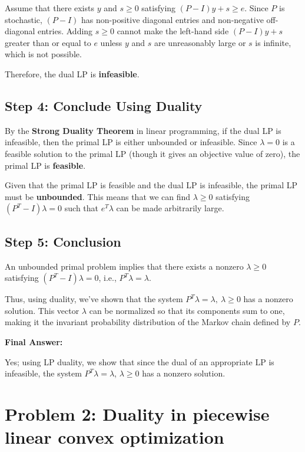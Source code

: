 \documentclass{article}
\begin{document}
Assume that there exists $y$ and $s \geq 0$ satisfying $(P - I) y + s \geq e$. Since $P$ is stochastic, $(P - I)$ has non-positive diagonal entries and non-negative off-diagonal entries. Adding $s \geq 0$ cannot make the left-hand side $(P - I) y + s$ greater than or equal to $e$ unless $y$ and $s$ are unreasonably large or $s$ is infinite, which is not possible.

Therefore, the dual LP is \textbf{infeasible}.

\subsection{Step 4: Conclude Using Duality}

By the \textbf{Strong Duality Theorem} in linear programming, if the dual LP is infeasible, then the primal LP is either unbounded or infeasible. Since $\lambda = 0$ is a feasible solution to the primal LP (though it gives an objective value of zero), the primal LP is \textbf{feasible}.

Given that the primal LP is feasible and the dual LP is infeasible, the primal LP must be \textbf{unbounded}. This means that we can find $\lambda \geq 0$ satisfying $(P^T - I) \lambda = 0$ such that $e^T \lambda$ can be made arbitrarily large.

\subsection{Step 5: Conclusion}

An unbounded primal problem implies that there exists a nonzero $\lambda \geq 0$ satisfying $(P^T - I) \lambda = 0$, i.e., $P^T \lambda = \lambda$.

Thus, using duality, we've shown that the system $P^T \lambda = \lambda, \ \lambda \geq 0$ has a nonzero solution. This vector $\lambda$ can be normalized so that its components sum to one, making it the invariant probability distribution of the Markov chain defined by $P$.

\textbf{Final Answer:}

Yes; using LP duality, we show that since the dual of an appropriate LP is infeasible, the system $P^T \lambda = \lambda$, $\lambda \geq 0$ has a nonzero solution.


\section*{Problem 2: Duality in piecewise linear convex optimization}
\end{document}
